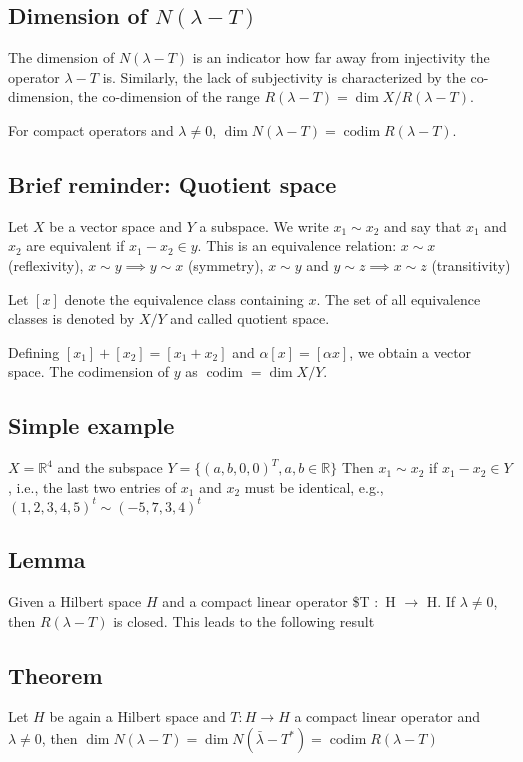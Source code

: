 \documentclass[11pt]{article}
\def\R{\mathbb{R}}
\begin{document}
\subsection{Dimension of \(N(\lambda - T)\)}
\label{sec:org2813771}
The dimension of \(N(\lambda - T)\) is an indicator how far away from
injectivity the operator \(\lambda - T\) is. Similarly, the lack of subjectivity is
characterized by the co-dimension, the co-dimension of the range \(R(\lambda -
   T) = \dim X/R(\lambda - T)\).

For compact operators and \(\lambda \neq 0\), \(\dim N(\lambda -T) =
   \operatorname{codim} R(\lambda - T)\).
\subsection{Brief reminder: Quotient space}
\label{sec:orgd352f7b}
Let \(X\) be a vector space and \(Y\) a subspace. We write \(x_1 \sim x_2\) and say
that \(x_1\) and \(x_2\) are equivalent if \(x_1 - x_2 \in y\). This is an
equivalence relation: \(x \sim x\) (reflexivity), \(x \sim y \implies y \sim x\)
(symmetry), \(x \sim y\) and \(y \sim z \implies x \sim z\) (transitivity)

Let \([x]\) denote the equivalence class containing \(x\). The set of all
equivalence classes is denoted by \(X/Y\) and called quotient space.

Defining \([x_1] + [x_2] = [x_1 + x_2]\) and \(\alpha[x] = [\alpha x]\), we
obtain a vector space. The codimension of \(y\) as \(\operatorname{codim} = \dim
   X / Y\).
\subsection{Simple example}
\label{sec:orgbf1f822}
\(X = \R^4\) and the subspace \(Y = \{(a, b, 0, 0)^T, a, b \in \R\}\) Then \(x_1
   \sim x_2\) if \(x_1 - x_2 \in Y\), i.e., the last two entries of \(x_1\) and \(x_2\)
must be identical, e.g., \((1, 2, 3, 4, 5)^t \sim (-5, 7, 3, 4)^t\)
\subsection{Lemma}
\label{sec:org1d41d46}
Given a Hilbert space \(H\) and a compact linear operator \$T \(\colon\) H
\(\rightarrow\) H. If \(\lambda \neq 0\), then \(R(\lambda - T)\) is closed. This
leads to the following result
\subsection{Theorem}
\label{sec:orgf425159}
Let \(H\) be again a Hilbert space and \(T \colon H \rightarrow H\) a compact
linear operator and \(\lambda \neq 0\), then \(\dim N(\lambda - T) = \dim
   N(\bar{\lambda} - T^{*}) = \operatorname{codim} R(\lambda - T)\)
\end{document}
